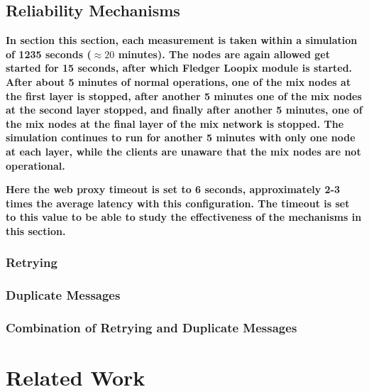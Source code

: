\documentclass[a4paper,11pt,oneside]{report}
\begin{document}
\section{Reliability Mechanisms}
\textbf{In section this section, each measurement is taken within a simulation of 1235 seconds  (\(\approx 20\) minutes). The nodes are again allowed get started for 15 seconds, after which Fledger Loopix module is started. After about 5 minutes of normal operations, one of the mix nodes at the first layer is stopped, after another 5 minutes one of the mix nodes at the second layer stopped, and finally after another 5 minutes, one of the mix nodes at the final layer of the mix network is stopped. The simulation continues to run for another 5 minutes with only one node at each layer, while the clients are unaware that the mix nodes are not operational.}

\textbf{Here the web proxy timeout is set to 6 seconds, approximately 2-3 times the average latency with this configuration. The timeout is set to this value to be able to study the effectiveness of the mechanisms in this section.}
\subsection{Retrying}

\subsection{Duplicate Messages}

\subsection{Combination of Retrying and Duplicate Messages}

\chapter{Related Work}

\end{document}
